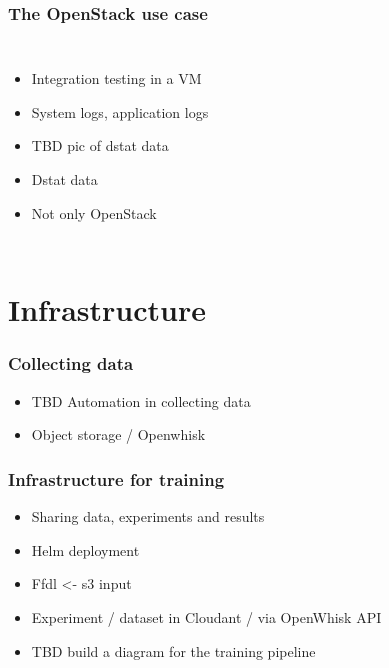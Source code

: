 \documentclass[aspectratio=169,11pt,hyperref={colorlinks=true}]{beamer}
\begin{document}
\begin{frame}
    \frametitle{The OpenStack use case}
    \begin{columns}
        \begin{itemize}
            \item{Integration testing in a VM}
            \item{System logs, application logs}
            \item{TBD pic of dstat data}
            \item{Dstat data}
            \item{Not only OpenStack}
        \end{itemize}
        \begin{figure}
        \begin{center}
        \end{center}
        \end{figure}
    \end{columns}
\end{frame}

\section{Infrastructure}
\begin{frame}
    \frametitle{Collecting data}
    \begin{itemize}
        \item{TBD Automation in collecting data}
        \item{Object storage / Openwhisk}
    \end{itemize}
\end{frame}

\begin{frame}
    \frametitle{Infrastructure for training}
    \begin{itemize}
        \item{Sharing data, experiments and results}
        \item{Helm deployment}
        \item{Ffdl <- s3 input}
        \item{Experiment / dataset in Cloudant / via OpenWhisk API}
        \item{TBD build a diagram for the training pipeline}
    \end{itemize}
\end{frame}
\end{document}
